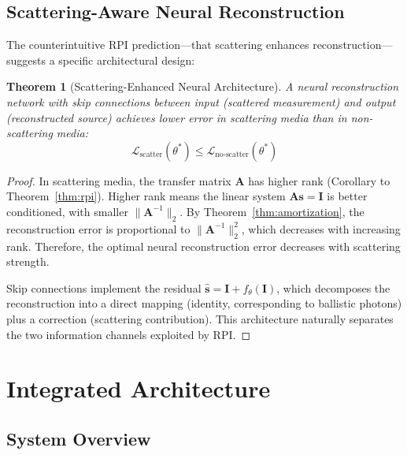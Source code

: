 \documentclass[11pt,a4paper]{article}
\newtheorem{theorem}{Theorem}[section]
\theoremstyle{definition}
\theoremstyle{remark}
\newcommand{\loss}{\mathcal{L}}
\newcommand{\params}{\theta}
\begin{document}
\subsection{Scattering-Aware Neural Reconstruction}

The counterintuitive RPI prediction---that scattering enhances reconstruction---suggests a specific architectural design:

\begin{theorem}[Scattering-Enhanced Neural Architecture]
\label{thm:scattering_arch}
A neural reconstruction network with skip connections between input (scattered measurement) and output (reconstructed source) achieves lower error in scattering media than in non-scattering media:
\begin{equation}
\loss_{\text{scatter}}(\params^*) \leq \loss_{\text{no-scatter}}(\params^*)
\end{equation}
\end{theorem}

\begin{proof}
In scattering media, the transfer matrix $\mathbf{A}$ has higher rank (Corollary to Theorem~\ref{thm:rpi}). Higher rank means the linear system $\mathbf{A}\mathbf{s} = \mathbf{I}$ is better conditioned, with smaller $\|\mathbf{A}^{-1}\|_2$. By Theorem~\ref{thm:amortization}, the reconstruction error is proportional to $\|\mathbf{A}^{-1}\|_2^2$, which decreases with increasing rank. Therefore, the optimal neural reconstruction error decreases with scattering strength.

Skip connections implement the residual $\hat{\mathbf{s}} = \mathbf{I} + f_\params(\mathbf{I})$, which decomposes the reconstruction into a direct mapping (identity, corresponding to ballistic photons) plus a correction (scattering contribution). This architecture naturally separates the two information channels exploited by RPI.
\end{proof}

\section{Integrated Architecture}
\label{sec:architecture}

\subsection{System Overview}
\end{document}
